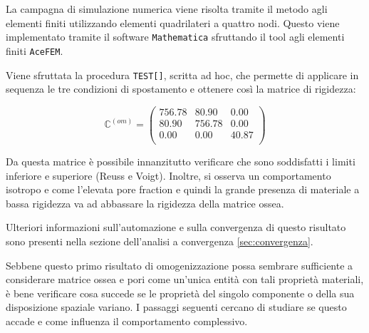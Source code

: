 \documentclass[a4paper,num-refs]{oup-contemporary}
\begin{document}
La campagna di simulazione numerica viene risolta tramite il metodo agli elementi finiti utilizzando elementi quadrilateri a quattro nodi. Questo viene implementato tramite il software \texttt{Mathematica} sfruttando il tool agli elementi finiti \texttt{AceFEM}. 

Viene sfruttata la procedura \texttt{TEST[]}, scritta ad hoc, che permette di applicare in sequenza le tre condizioni di spostamento e ottenere così la matrice di rigidezza:

\begin{equation}
\mathbb C^{(om)}=\left(
\begin{array}{ccc}
	756.78 & 80.90 & 0.00 \\
	80.90 & 756.78 & 0.00 \\
	0.00 & 0.00 & 40.87\\
\end{array}
\right)
\end{equation}

Da questa matrice è possibile innanzitutto verificare che sono soddisfatti i limiti inferiore e superiore (Reuss e Voigt). 
Inoltre, si osserva un comportamento isotropo e come l'elevata pore fraction e quindi la grande presenza di materiale a bassa rigidezza va ad abbassare la rigidezza della matrice ossea. 

Ulteriori informazioni sull'automazione e sulla convergenza di questo risultato sono presenti nella sezione dell'analisi a convergenza \cref{sec:convergenza}.

Sebbene questo primo risultato di omogenizzazione possa sembrare sufficiente a considerare matrice ossea e pori come un'unica entità con tali proprietà materiali, è bene verificare cosa succede se le proprietà del singolo componente o della sua disposizione spaziale variano. I passaggi seguenti cercano di studiare se questo accade e come influenza il comportamento complessivo. 
\end{document}
